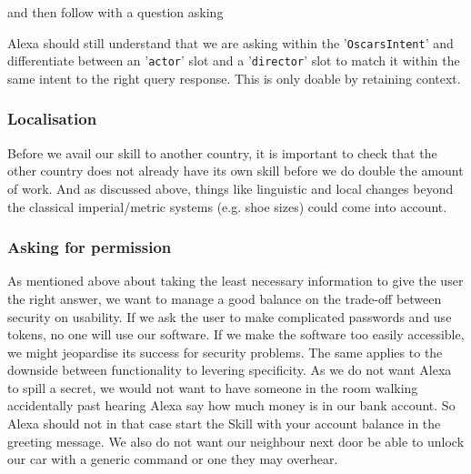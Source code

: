 \begin{flushright}
\end{flushright}
\noindent and then follow with a question asking




\noindent Alexa should still understand that we are asking within the '\texttt{OscarsIntent}' and differentiate between an '\texttt{actor}' slot and a '\texttt{director}' slot to match it within the same intent to the right query response.
This is only doable by retaining context.


\subsubsection*{Localisation}
Before we avail our skill to another country, it is important to check that the other country does not already have its own skill before we do double the amount of work. And as discussed above, things like linguistic and local changes beyond the classical imperial/metric systems (e.g. shoe sizes) could come into account.

\subsubsection*{Asking for permission}
As mentioned above about taking the least necessary information to give the user the right answer, we want to manage a good balance on the trade-off between security on usability. If we ask the user to make complicated passwords and use tokens, no one will use our software. If we make the software too easily accessible, we might jeopardise its success for security problems. The same applies to the downside between functionality to levering specificity. As we do not want Alexa to spill a secret, we would not want to have someone in the room walking accidentally past hearing Alexa say how much money is in our bank account. So Alexa should not in that case start the Skill with your account balance in the greeting message. We also do not want our neighbour next door be able to unlock our car with a generic command or one they may overhear.

